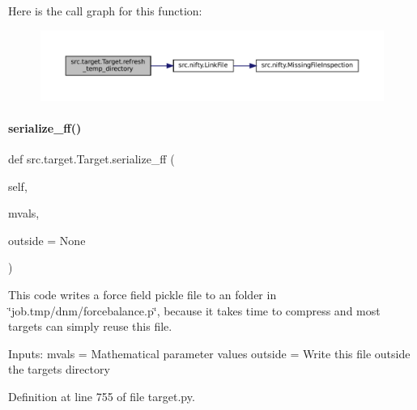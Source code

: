 Here is the call graph for this function\+:
\nopagebreak
\begin{figure}[H]
\begin{center}
\leavevmode
\includegraphics[width=350pt]{classsrc_1_1target_1_1Target_ad8126429a9b72dff627da96934cd7f5c_cgraph}
\end{center}
\end{figure}
\mbox{\label{classsrc_1_1target_1_1Target_a8d05de21b2477b71aa74ea001f4d62b5}} 
\paragraph{\texorpdfstring{serialize\+\_\+ff()}{serialize\_ff()}}
{\footnotesize\ttfamily def src.\+target.\+Target.\+serialize\+\_\+ff (\begin{DoxyParamCaption}\item[{}]{self,  }\item[{}]{mvals,  }\item[{}]{outside = {\ttfamily None} }\end{DoxyParamCaption})\hspace{0.3cm}{\ttfamily [inherited]}}



This code writes a force field pickle file to an folder in \char`\"{}job.\+tmp/dnm/forcebalance.\+p\char`\"{}, because it takes time to compress and most targets can simply reuse this file. 

Inputs\+: mvals = Mathematical parameter values outside = Write this file outside the targets directory 

Definition at line 755 of file target.\+py.

\mbox{\label{classsrc_1_1target_1_1Target_af543ca7235b5112aa29018ffa7bc1e1c}} 
